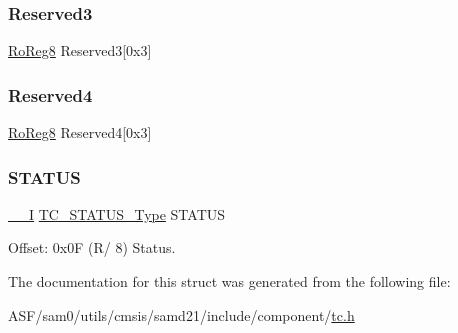 \mbox{\label{struct_tc_count8_ab22abf5c83fa4a01809facc55e0fda29}} 
\subsubsection{\texorpdfstring{Reserved3}{Reserved3}}
{\footnotesize\ttfamily \mbox{\hyperlink{group___s_a_m_d21_e15_a__definitions_ga0d957f1433aaf5d70e4dc2b68288442d}{Ro\+Reg8}} Reserved3\mbox{[}0x3\mbox{]}}

\mbox{\label{struct_tc_count8_abf127d09ee1c1a9cf2b0d88d946dbe0a}} 
\subsubsection{\texorpdfstring{Reserved4}{Reserved4}}
{\footnotesize\ttfamily \mbox{\hyperlink{group___s_a_m_d21_e15_a__definitions_ga0d957f1433aaf5d70e4dc2b68288442d}{Ro\+Reg8}} Reserved4\mbox{[}0x3\mbox{]}}

\mbox{\label{struct_tc_count8_af7f33b0963c8311ce45fe0f929a1a9c5}} 
\subsubsection{\texorpdfstring{STATUS}{STATUS}}
{\footnotesize\ttfamily \mbox{\hyperlink{core__cm0plus_8h_af63697ed9952cc71e1225efe205f6cd3}{\+\_\+\+\_\+I}} \mbox{\hyperlink{union_t_c___s_t_a_t_u_s___type}{T\+C\+\_\+\+S\+T\+A\+T\+U\+S\+\_\+\+Type}} S\+T\+A\+T\+US}



Offset\+: 0x0F (R/ 8) Status. 



The documentation for this struct was generated from the following file\+:\begin{DoxyCompactItemize}
\item 
A\+S\+F/sam0/utils/cmsis/samd21/include/component/\mbox{\hyperlink{utils_2cmsis_2samd21_2include_2component_2tc_8h}{tc.\+h}}\end{DoxyCompactItemize}
